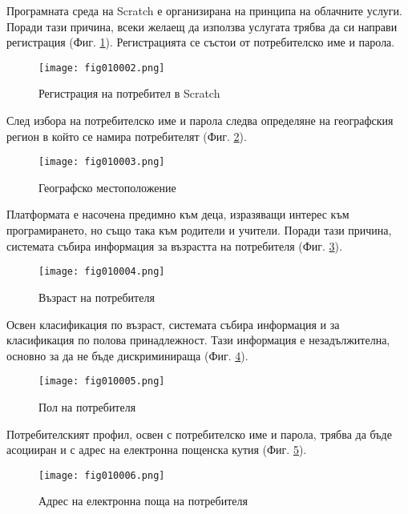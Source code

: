 Програмната среда на Scratch е организирана на принципа на облачните услуги. Поради тази причина, всеки желаещ да използва услугата трябва да си направи регистрация (Фиг. \ref{fig010002}). Регистрацията се състои от потребителско име и парола.

\begin{figure}[H]
  \centering
  \texttt{[image: fig010002.png]}
  \caption{Регистрация на потребител в Scratch}
\label{fig010002}
\end{figure}

След избора на потребителско име и парола следва определяне на географския регион в който се намира потребителят (Фиг. \ref{fig010003}).

\begin{figure}[H]
  \centering
  \texttt{[image: fig010003.png]}
  \caption{Географско местоположение}
\label{fig010003}
\end{figure}

Платформата е насочена предимно към деца, изразяващи интерес към програмирането, но също така към родители и учители. Поради тази причина, системата събира информация за възрастта на потребителя (Фиг. \ref{fig010004}).

\begin{figure}[H]
  \centering
  \texttt{[image: fig010004.png]}
  \caption{Възраст на потребителя}
\label{fig010004}
\end{figure}

Освен класификация по възраст, системата събира информация и за класификация по полова принадлежност. Тази информация е незадължителна, основно за да не бъде дискриминираща (Фиг. \ref{fig010005}).

\begin{figure}[H]
  \centering
  \texttt{[image: fig010005.png]}
  \caption{Пол на потребителя}
\label{fig010005}
\end{figure}

Потребителският профил, освен с потребителско име и парола, трябва да бъде асоцииран и с адрес на електронна пощенска кутия (Фиг. \ref{fig010006}).

\begin{figure}[H]
  \centering
  \texttt{[image: fig010006.png]}
  \caption{Адрес на електронна поща на потребителя}
\label{fig010006}
\end{figure}

